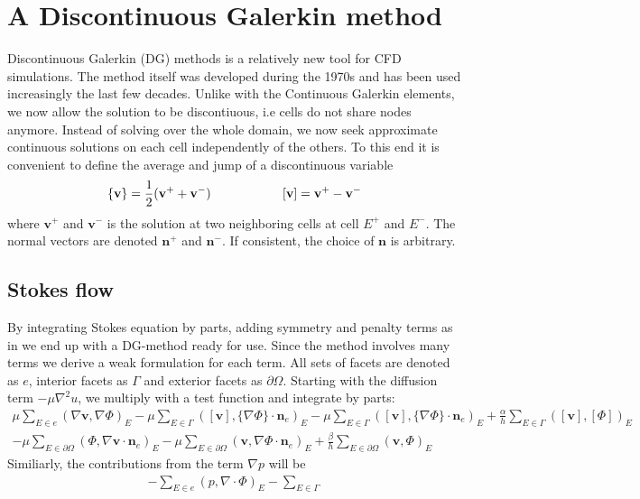 \section{A Discontinuous Galerkin method}
Discontinuous Galerkin (DG) methods is a relatively new tool for CFD simulations. The method itself was developed during the 1970s and has been used increasingly the last few decades. Unlike with the Continuous Galerkin elements, we now allow the solution to be discontiuous, i.e cells do not share nodes anymore. Instead of solving over the whole domain, we now seek approximate continuous solutions on each cell independently of the others. To this end it is convenient to define the average and jump of a discontinuous variable
\begin{align} 
\{\mathbf{v}\} = \frac{1}{2}(\mathbf{v}^+ + \mathbf{v}^-) \hspace{2 cm}  [\mathbf{v}]  =  \mathbf{v}^+ - \mathbf{v}^- \label{Avg_jump}
\end{align}
where $\mathbf{v}^+$ and $\mathbf{v}^-$ is the solution at two neighboring cells at cell $E^+$ and $E^-$. The normal vectors are denoted $\mathbf{n}^+$ and $\mathbf{n}^-$. If consistent, the choice of $\mathbf{n}$ is arbitrary. \cite{Rivi08}
\subsection{Stokes flow}
By integrating Stokes equation by parts, adding symmetry and penalty terms as in \cite{Rivi05} we end up with a DG-method ready for use. Since the method involves many terms we derive a weak formulation for each term. All sets of facets are denoted as $e$, interior facets as $\Gamma$ and exterior facets as $\partial \Omega$. Starting with the diffusion term $-\mu \nabla ^2 u$, we multiply with a test function and integrate by parts:
\begin{align}
	\mu \sum_{E \in e} (\nabla \mathbf{v}, \nabla \Phi)_E 
   -\mu \sum_{E \in \Gamma}([\mathbf{v}], \{ \nabla \Phi \} \cdot \mathbf{n}_e)_E 
   -\mu \sum_{E \in \Gamma}([\mathbf{v}], \{ \nabla \Phi \} \cdot \mathbf{n}_e)_E 
	+ \frac{\alpha}{h} \sum_{E \in \Gamma}([\mathbf{v}],[\Phi])_E \nonumber \\
	-\mu \sum_{E \in \partial \Omega}(\Phi,  \nabla \mathbf{v} \cdot \mathbf{n}_e)_E 
   -\mu \sum_{E \in \partial \Omega}(\mathbf{v},  \nabla \Phi  \cdot \mathbf{n}_e)_E 
	+ \frac{\beta}{h} \sum_{E \in \partial \Omega}(\mathbf{v},\Phi)_E 
 \label {Diffusion}
\end{align}
Similiarly, the contributions from the term $\nabla p$ will be
\begin{align}
	- \sum_{E \in e}(p, \nabla \cdot \Phi)_E - \sum_{E \in \Gamma}
\end{align}
